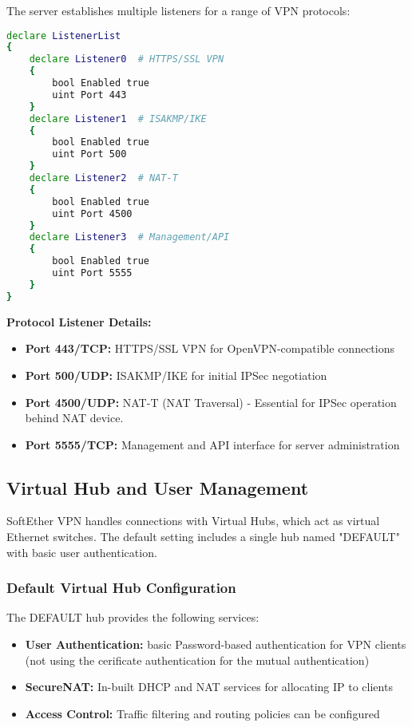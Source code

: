 The server establishes multiple listeners for a range of VPN protocols:

\begin{lstlisting}[language=bash]
declare ListenerList
{
    declare Listener0  # HTTPS/SSL VPN
    {
        bool Enabled true
        uint Port 443
    }
    declare Listener1  # ISAKMP/IKE
    {
        bool Enabled true
        uint Port 500
    }
    declare Listener2  # NAT-T
    {
        bool Enabled true
        uint Port 4500
    }
    declare Listener3  # Management/API
    {
        bool Enabled true
        uint Port 5555
    }
}
\end{lstlisting}

\textbf{Protocol Listener Details:}

\begin{itemize}
    \item \textbf{Port 443/TCP:} HTTPS/SSL VPN for OpenVPN-compatible connections
    \item \textbf{Port 500/UDP:} ISAKMP/IKE for initial IPSec negotiation
    \item \textbf{Port 4500/UDP:} NAT-T (NAT Traversal) - Essential for IPSec operation behind NAT device.
    \item \textbf{Port 5555/TCP:} Management and API interface for server administration
\end{itemize}

\subsection{Virtual Hub and User Management}

SoftEther VPN handles connections with Virtual Hubs, which act as virtual Ethernet switches. The default setting includes a single hub named "DEFAULT" with basic user authentication.

\subsubsection{Default Virtual Hub Configuration}

The DEFAULT hub provides the following services:

\begin{itemize}
    \item \textbf{User Authentication:} basic Password-based authentication for VPN clients (not using the cerificate authentication for the mutual authentication)
    \item \textbf{SecureNAT:}  In-built DHCP and NAT services for allocating IP to clients
    \item \textbf{Access Control:} Traffic filtering and routing policies can be configured
\end{itemize}


